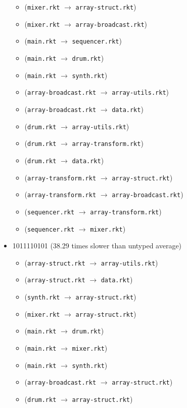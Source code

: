 \documentclass{article}
\newcommand{\mono}[1]{\texttt{#1}}
\begin{document}
\begin{itemize}
\begin{itemize}
  \item (\mono{mixer.rkt} $\rightarrow$ \mono{array-struct.rkt})
  \item (\mono{mixer.rkt} $\rightarrow$ \mono{array-broadcast.rkt})
  \item (\mono{main.rkt} $\rightarrow$ \mono{sequencer.rkt})
  \item (\mono{main.rkt} $\rightarrow$ \mono{drum.rkt})
  \item (\mono{main.rkt} $\rightarrow$ \mono{synth.rkt})
  \item (\mono{array-broadcast.rkt} $\rightarrow$ \mono{array-utils.rkt})
  \item (\mono{array-broadcast.rkt} $\rightarrow$ \mono{data.rkt})
  \item (\mono{drum.rkt} $\rightarrow$ \mono{array-utils.rkt})
  \item (\mono{drum.rkt} $\rightarrow$ \mono{array-transform.rkt})
  \item (\mono{drum.rkt} $\rightarrow$ \mono{data.rkt})
  \item (\mono{array-transform.rkt} $\rightarrow$ \mono{array-struct.rkt})
  \item (\mono{array-transform.rkt} $\rightarrow$ \mono{array-broadcast.rkt})
  \item (\mono{sequencer.rkt} $\rightarrow$ \mono{array-transform.rkt})
  \item (\mono{sequencer.rkt} $\rightarrow$ \mono{mixer.rkt})
  \end{itemize}
\item 1011110101 (38.29 times slower than untyped average)
  \begin{itemize}
  \item (\mono{array-struct.rkt} $\rightarrow$ \mono{array-utils.rkt})
  \item (\mono{array-struct.rkt} $\rightarrow$ \mono{data.rkt})
  \item (\mono{synth.rkt} $\rightarrow$ \mono{array-struct.rkt})
  \item (\mono{mixer.rkt} $\rightarrow$ \mono{array-struct.rkt})
  \item (\mono{main.rkt} $\rightarrow$ \mono{drum.rkt})
  \item (\mono{main.rkt} $\rightarrow$ \mono{mixer.rkt})
  \item (\mono{main.rkt} $\rightarrow$ \mono{synth.rkt})
  \item (\mono{array-broadcast.rkt} $\rightarrow$ \mono{array-struct.rkt})
  \item (\mono{drum.rkt} $\rightarrow$ \mono{array-struct.rkt})

\end{itemize}
\end{itemize}
\end{document}

